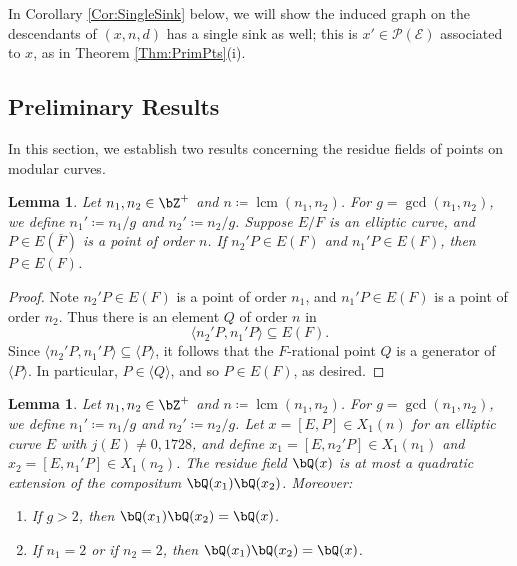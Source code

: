 \documentclass[11pt,reqno]{amsart}
\theoremstyle{plain}
\newtheorem{lemma}[theorem]{Lemma}
\theoremstyle{definition}
\DeclareMathOperator{\lcm}{lcm}
\newcommand{\Q}{\bQ}
\newcommand{\Z}{\bZ}
\newcommand{\abedit}[1]{{\color{blue} #1}}
\begin{document}
\abedit{In Corollary \ref{Cor:SingleSink} below, we will show the induced graph on the descendants of $(x,n,d)$ has a single sink as well; this is $x' \in \mathcal{P(E)}$ associated to $x$, as in Theorem \ref{Thm:PrimPts}(i).}

\subsection{Preliminary Results} In this section, we establish two results concerning the residue fields of points on modular curves.

\begin{lemma}\label{lem:LCM}
Let $n_1,n_2 \in \Z^+$ and $n \coloneqq \lcm(n_1,n_2)$. For $g=\gcd(n_1,n_2)$, we define $n_1'\coloneqq n_1/g$ and $n_2'\coloneqq n_2/g$.
Suppose $E/F$ is an elliptic curve, and $P \in E(\overline{F})$ is a point of order $n$. If $n_2'P\in E(F)$ and $n_1'P \in E(F)$, then $P \in E(F)$.
\end{lemma}

\begin{proof}
Note $n_2'P \in E(F)$ is a point of order $n_1$, and $n_1'P \in E(F)$ is a point of order $n_2$.  Thus there is an element $Q$ of order $n$ in
\[
\langle n_2'P, n_1' P \rangle \subseteq E(F).
\] Since $\langle n_2'P, n_1' P \rangle \subseteq \langle P \rangle$, it follows that the $F$-rational point $Q$ is a generator of $\langle P \rangle$. In particular, $P\in \langle Q \rangle$, and so $P\in E(F)$, as desired.
\end{proof}

\begin{lemma} \label{lem:compositum_res_fields}
Let $n_1,n_2 \in \Z^+$ and $n \coloneqq \lcm(n_1,n_2)$. For $g=\gcd(n_1,n_2)$, we define $n_1'\coloneqq n_1/g$ and $n_2'\coloneqq n_2/g$. Let $x=[E,P] \in X_1(n)$ for an elliptic curve $E$ with $j(E) \neq 0,1728$, and define $x_1=[E,n_2'P] \in X_1(n_1)$ and $x_2=[E,n_1'P] \in X_1(n_2)$. The residue field $\Q(x)$ is at most a quadratic extension of the compositum $\Q(x_1)\Q(x_2)$. Moreover:
\begin{enumerate}
\item If $g>2$, then $\Q(x_1)\Q(x_2)=\Q(x)$.
\item If $n_1=2$ or if $n_2=2$, then $\Q(x_1)\Q(x_2)=\Q(x)$.
\end{enumerate}
\end{lemma}
\end{document}
